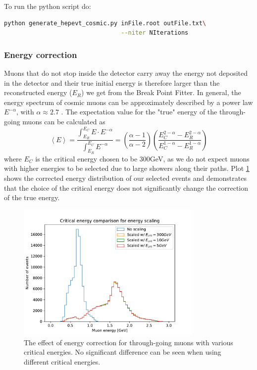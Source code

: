 \documentclass[12pt]{article}
\begin{document}
To run the python script do:
\begin{lstlisting}[frame=single,language=bash]
python generate_hepevt_cosmic.py inFile.root outFile.txt\
                                 --niter NIterations
\end{lstlisting}

\subsubsection{Energy correction}
Muons that do not stop inside the detector carry away the energy not deposited in the detector and their true initial energy is therefore larger than the reconstructed energy ($E_R$) we get from the Break Point Fitter. In general, the energy spectrum of cosmic muons can be approximately described by a power law $E^{-\alpha}$, with $\alpha\approx2.7$ \cite{NOVA-doc-51327-v3,rpp2022-rev-cosmic-rays.pdf}. The expectation value for the "true" energy of the through-going muons can be calculated as
\begin{equation}
\left\langle E\right\rangle =\frac{\int^{E_C}_{E_R} E\cdot E^{-\alpha}}{\int^{E_C}_{E_R} E^{-\alpha}}=\left(\frac{\alpha -1}{\alpha -2}\right)\left(\frac{E_C^{2-\alpha}-E_R^{2-\alpha}}{E_C^{1-\alpha}-E_R^{1-\alpha}}\right)
\end{equation}
where $E_C$ is the critical energy chosen to be 300GeV, as we do not expect muons with higher energies to be selected due to large showers along their paths. Plot \ref{figEnergyScaling} shows the corrected energy distribution of our selected events and demonstrates that the choice of the critical energy does not significantly change the correction of the true energy. 

\begin{figure}[hbtp]
\centering
\includegraphics[width=0.8\textwidth]{ECritComparison.pdf}
\caption{The effect of energy correction for through-going muons with various critical energies. No significant difference can be seen when using different critical energies.}
\label{figEnergyScaling}
\end{figure}
\end{document}
